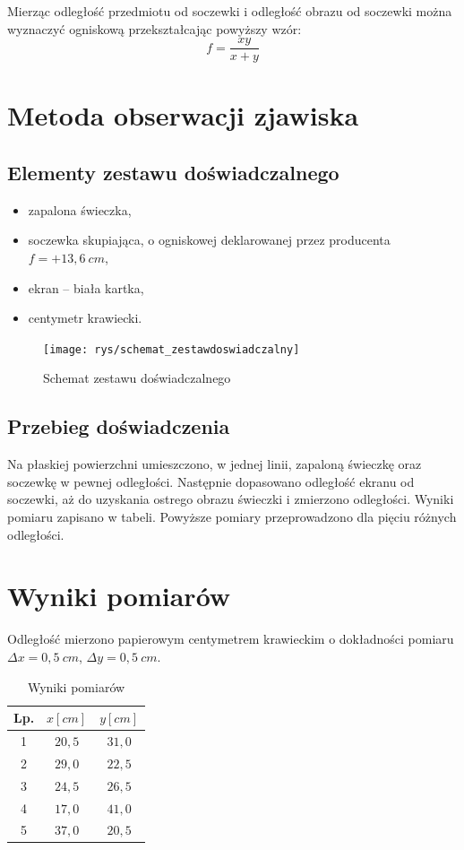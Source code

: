 \documentclass[11pt,oneside,final,notitlepage,a4paper,wide]{mwart}
\begin{document}
		Mierząc odległość przedmiotu od soczewki i odległość obrazu od soczewki można wyznaczyć ogniskową przekształcając powyższy wzór:
		\begin{equation}
			f = \frac{xy}{x + y} \label{wzór.f}
		\end{equation}
%
\section{Metoda obserwacji zjawiska}
	\subsection{Elementy zestawu doświadczalnego}
		\begin{itemize}
			\item zapalona świeczka,
			\item soczewka skupiająca, o ogniskowej deklarowanej przez producenta $f = +13,6 \ cm$,
			\item ekran -- biała kartka,
			\item centymetr krawiecki.
		\end{itemize}
		\begin{figure}[h]
			\centering
			\texttt{[image: rys/schemat\_zestawdoswiadczalny]}
			\caption{Schemat zestawu doświadczalnego}
		\end{figure}
	\subsection{Przebieg doświadczenia}
		Na płaskiej powierzchni umieszczono, w jednej linii, zapaloną świeczkę oraz soczewkę w pewnej odległości. Następnie dopasowano odległość ekranu od soczewki, aż do uzyskania ostrego obrazu świeczki i zmierzono odległości. Wyniki pomiaru zapisano w tabeli. Powyższe pomiary przeprowadzono dla pięciu różnych odległości. 
%
\section{Wyniki pomiarów}
	Odległość mierzono papierowym centymetrem krawieckim o dokładności pomiaru $\Delta x = 0,5 \ cm$, $\Delta y = 0,5 \ cm$.
	\begin{table}[h]
		\centering
		\begin{tabular}{c|c|c}
			Lp. & $x \left[ cm \right]$ & $y \left[ cm \right]$ \\ \hline
			1 & $20,5$ & $31,0$ \\
			2 & $29,0$ & $22,5$ \\
			3 & $24,5$ & $26,5$ \\
			4 & $17,0$ & $41,0$ \\
			5 & $37,0$ & $20,5$ \\
		\end{tabular}
		\caption{Wyniki pomiarów}
	\end{table}
%
\end{document}
